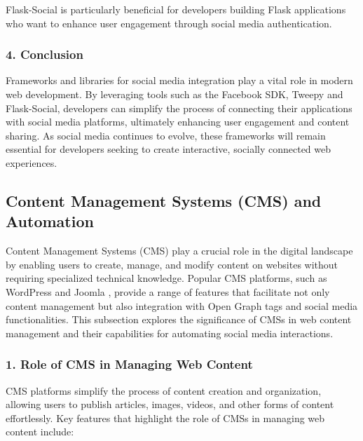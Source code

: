 Flask-Social is particularly beneficial for developers building Flask applications who want to enhance user engagement through social media authentication.

\subsubsection{4. Conclusion}

Frameworks and libraries for social media integration play a vital role in modern web development. By leveraging tools such as the Facebook SDK, Tweepy and Flask-Social, developers can simplify the process of connecting their applications with social media platforms, ultimately enhancing user engagement and content sharing. As social media continues to evolve, these frameworks will remain essential for developers seeking to create interactive, socially connected web experiences.

\subsection{Content Management Systems (CMS) and Automation}
\label{subsec:content_management_systems_cms_and_automation}

Content Management Systems (CMS) play a crucial role in the digital landscape by enabling users to create, manage, and modify content on websites without requiring specialized technical knowledge. Popular CMS platforms, such as WordPress \cite{wordpress_documentation} and Joomla \cite{joomla_documentation}, provide a range of features that facilitate not only content management but also integration with Open Graph tags and social media functionalities. This subsection explores the significance of CMSs in web content management and their capabilities for automating social media interactions.

\subsubsection{1. Role of CMS in Managing Web Content}

CMS platforms simplify the process of content creation and organization, allowing users to publish articles, images, videos, and other forms of content effortlessly. Key features that highlight the role of CMSs in managing web content include:

